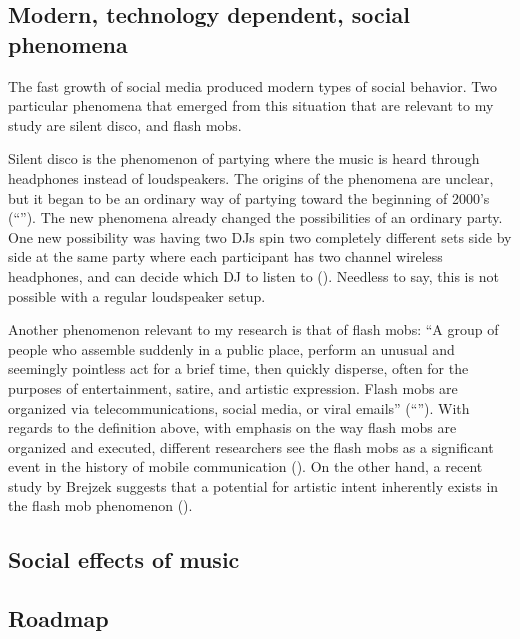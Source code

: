 \subsection{Modern, technology dependent, social phenomena}


The fast growth of social media produced modern types of social behavior.
Two particular phenomena that emerged from this situation that are relevant to my study are silent disco, and flash mobs.

Silent disco is the phenomenon of partying where the music is heard through headphones instead of loudspeakers.
The origins of the phenomena are unclear, but it began to be an ordinary way of partying toward the beginning of 2000's (``'').
The new phenomena already changed the possibilities of an ordinary party.
One new possibility was having two DJs spin two completely different sets side by side at the same party where each participant has two channel wireless headphones, and can decide which DJ to listen to (\cite{web:headphonedisco}).
Needless to say, this is not possible with a regular loudspeaker setup.

Another phenomenon relevant to my research is that of flash mobs: ``A group of people who assemble suddenly in a public place, perform an unusual and seemingly pointless act for a brief time, then quickly disperse, often for the purposes of entertainment, satire, and artistic expression. Flash mobs are organized via telecommunications, social media, or viral emails'' (``'').
With regards to the definition above, with emphasis on the way flash mobs are organized and executed, different researchers see the flash mobs as a significant event in the history of mobile communication (\cite{nicholson05}).
On the other hand, a recent study by Brejzek suggests that a potential for artistic intent inherently exists in the flash mob phenomenon (\cite*{brejzek10}).

\subsection{Social effects of music}


\subsection{Roadmap}\label{roadmap}

